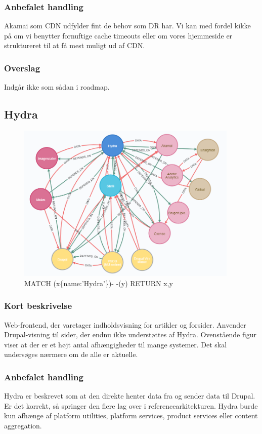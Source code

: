 \documentclass{article}
\begin{document}
\subsubsection*{Anbefalet handling}
Akamai som CDN udfylder fint de behov som DR har. 
Vi kan med fordel kikke på om vi benytter fornuftige cache timeouts eller om vores hjemmeside er struktureret til at få mest muligt ud af CDN.

\subsubsection*{Overslag}
Indgår ikke som sådan i roadmap.


\subsection{Hydra}
\begin{figure}[h]
\includegraphics[width=300pt]{Hydra.PNG}
\caption{MATCH (x\{name:'Hydra'\})- -(y) RETURN x,y}
\end{figure}
\subsubsection*{Kort beskrivelse}
Web-frontend, der varetager indholdsvisning for artikler og forsider. Anvender Drupal-visning til sider, der endnu ikke understøttes af Hydra.
Ovenstående figur viser at der er et højt antal afhængigheder til mange systemer. Det skal undersøges nærmere om de alle er aktuelle.
\subsubsection*{Anbefalet handling}
Hydra er beskrevet som at den direkte henter data fra og sender data til Drupal. Er det korrekt, så springer den flere lag over i referencearkitekturen.
Hydra burde kun afhænge af platform utilities, platform services, product services eller content aggregation.
\end{document}
